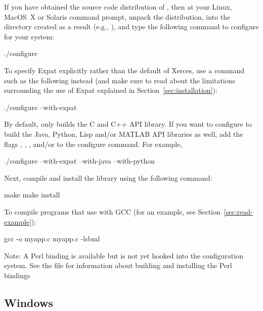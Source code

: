 \documentclass{sbmlmanual}
\begin{document}
If you have obtained the source code distribution of \libsbml{}, then at
your Linux, MacOS~X or Solaris command prompt, unpack the distribution,
 into the directory created as a result (e.g.,
), and type the following command to configure
\libsbml{} for your system:

\begin{shellVerbatim}
  ./configure
\end{shellVerbatim}

To specify Expat explicitly rather than the \libsbml{} default of Xerces,
use a command such as the following instead (and make sure to read about
the limitations surrounding the use of Expat explained in
Section~\ref{sec:installation}):

\begin{shellVerbatim}
  ./configure --with-expat
\end{shellVerbatim}

By default, \libsbml{} only builds the C and C++ API library.  If you want
to configure \libsbml{} to build the Java, Python, Lisp and/or MATLAB API
libraries as well, add the flags ,
, , and/or  to
the configure command.  For example,

\begin{shellVerbatim}
  ./configure --with-expat --with-java --with-python
\end{shellVerbatim}

Next, compile and install the \libsbml{} library using the following command:

\begin{shellVerbatim}
  make
  make install
\end{shellVerbatim}

To compile programs that use \libsbml{} with GCC (for an example, see
Section~\ref{sec:read-example}):

\begin{shellVerbatim}
  gcc -o myapp.c myapp.c -lsbml
\end{shellVerbatim}

Note: A Perl binding is available but is not yet hooked into the
configuration system.  See the file  for
information about building and installing the Perl bindings


\subsection{Windows}
\end{document}
